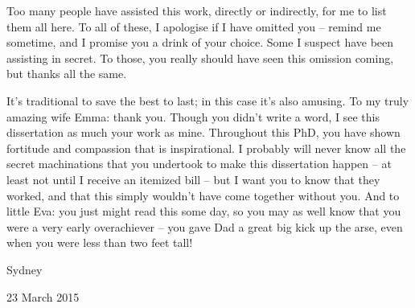 Too many people have assisted this work, directly or indirectly, for me to list them all here.  To all of these, I apologise if I have omitted you -- remind me sometime, and I promise you a drink of your choice.  Some I suspect have been assisting in secret.  To those, you really should have seen this omission coming, but thanks all the same.

It's traditional to save the best to last; in this case it's also amusing.  To my truly amazing wife Emma: thank you.  Though you didn't write a word, I see this dissertation as much your work as mine.  Throughout this PhD, you have shown fortitude and compassion that is inspirational.  I probably will never know all the secret machinations that you undertook to make this dissertation happen -- at least not until I receive an itemized bill -- but I want you to know that they worked, and that this simply wouldn't have come together without you.  And to little Eva: you just might read this some day, so you may as well know that you were a very early overachiever -- you gave Dad a great big kick up the arse, even when you were less than two feet tall!

\vspace{15mm}

\hspace{70mm}Sydney

\hspace{70mm}23 March 2015
